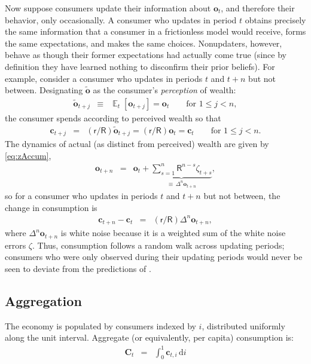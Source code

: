 \documentclass[titlepage]{article}
\DeclareMathOperator{\Ex}{\mathbb{E}} %
\begin{document}
Now suppose consumers update their information about $\mathbf{o}_t$, and therefore their behavior, only occasionally.  A consumer who updates in period $t$ obtains precisely the same information that a consumer in a frictionless model would receive, forms the same expectations, and makes the same choices.  Nonupdaters, however, behave as though their former expectations had actually come true (since by definition they have learned nothing to disconfirm their prior beliefs).  For example, consider a consumer who updates in periods $t$ and $t+n$ but not between.  Designating $\widetilde{\mathbf{o}}$ as the consumer's {\it perception} of wealth:
  \begin{eqnarray*}
\widetilde{\mathbf{o}}_{t+j} & \equiv & \Ex_{t}[\mathbf{o}_{t+j}] = \mathbf{o}_{t} \qquad \text{for }  1\le j < n,
\end{eqnarray*}
  the consumer spends according to perceived wealth so that
  \begin{eqnarray*}
\mathbf{c}_{t+j} & = & (\mathsf{r}/\mathsf{R})\widetilde{\mathbf{o}}_{t+j} = (\mathsf{r}/\mathsf{R})     \mathbf{o} _{t} = \mathbf{c}_{t} \qquad \text{for }  1\le j < n.
\end{eqnarray*}
The dynamics of actual (as distinct from perceived) wealth are given by \eqref{eq:zAccum},
\begin{eqnarray*}
 \mathbf{o}_{t+n} & = & \mathbf{o}_{t}+\underbrace{\sum_{s=1}^{n} \mathsf{R}^{n-s}\zeta_{t+s}}_{\equiv\,\Delta^{n} \mathbf{o}_{t+n}},
\end{eqnarray*}
 so for a consumer who updates in periods $t$ and $t+n$ but not between, the change in consumption is
\begin{eqnarray*}
         \mathbf{c}_{t+n}-\mathbf{c}_{t}  & = & (\mathsf{r}/\mathsf{R})\Delta^{n}\mathbf{o}_{t+n},
\end{eqnarray*}
  where $\Delta^{n}\mathbf{o}_{t+n}$ is white noise because it is a weighted sum of the white noise errors $\zeta$.  Thus, consumption follows a random walk across updating periods; consumers who were only observed during their updating periods would never be seen to deviate from the predictions of \cite{hallRandomWalk}.

\subsection{Aggregation}

The economy is populated by consumers indexed by $i$, distributed uniformly along the unit interval.  Aggregate (or equivalently, per capita) consumption is:
\begin{eqnarray*}
        \mathbf{C}_{t} & = & \int_{0}^{1} \mathbf{c}_{t,i}\,\text{d}i
\end{eqnarray*}
 
\end{document}
